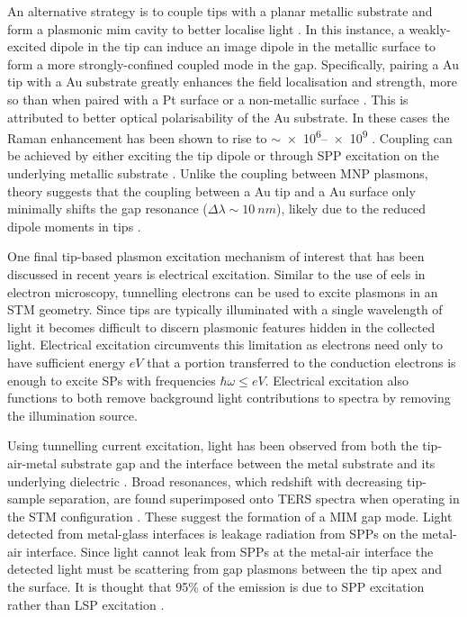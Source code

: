 \documentclass{article}
\begin{document}
An alternative strategy is to couple tips with a planar metallic substrate and form a plasmonic \gls{mim} cavity to better localise light \cite{ren2004, neacsu2006, hayazawa2007, yano2007, pettinger2009, uetsuki2012, lindquist2013}. In this instance, a weakly-excited dipole in the tip can induce an image dipole in the metallic surface to form a more strongly-confined coupled mode in the gap. Specifically, pairing a Au tip with a Au substrate greatly enhances the field localisation and strength, more so than when paired with a Pt surface \cite{ren2004} or a non-metallic surface \cite{downes2006}. This is attributed to better optical polarisability of the Au substrate. In these cases the Raman enhancement has been shown to rise to $\sim$\num{e6}--\num{e9} \cite{uetsuki2012}. Coupling can be achieved by either exciting the tip dipole or through SPP excitation on the underlying metallic substrate \cite{hayazawa2007, uetsuki2012}. Unlike the coupling between MNP plasmons, theory suggests that the coupling between a Au tip and a Au surface only minimally shifts the gap resonance ($\Delta\lambda\sim\SI{10}{nm}$){\color{red}, likely due to the reduced dipole moments in tips} \cite{downes2006}. %

One final tip-based plasmon excitation mechanism of interest that has been discussed in recent years is electrical excitation. Similar to the use of \gls{eels} in electron microscopy, tunnelling electrons can be used to excite plasmons in an STM geometry. Since tips are typically illuminated with a single wavelength of light it becomes difficult to discern plasmonic features hidden in the collected light. Electrical excitation circumvents this limitation as electrons need only to have sufficient energy $eV$ that a portion transferred to the conduction electrons is enough to excite SPs with frequencies $\hbar\omega \leq eV$. Electrical excitation also functions to both remove background light contributions to spectra by removing the illumination source.

Using tunnelling current excitation, light has been observed from both the tip-air-metal substrate gap \cite{pettinger2007, pettinger2009} and the interface between the metal substrate and its underlying dielectric \cite{wang2011}. Broad resonances, which redshift with decreasing tip-sample separation, are found superimposed onto TERS spectra when operating in the STM configuration \cite{pettinger2007, pettinger2009}. These suggest the formation of a MIM gap mode. Light detected from metal-glass interfaces is leakage radiation from SPPs on the metal-air interface. Since light cannot leak from SPPs at the metal-air interface the detected light must be scattering from gap plasmons between the tip apex and the surface. It is thought that 95\% of the emission is due to SPP excitation rather than LSP excitation \cite{wang2011}.
\end{document}
